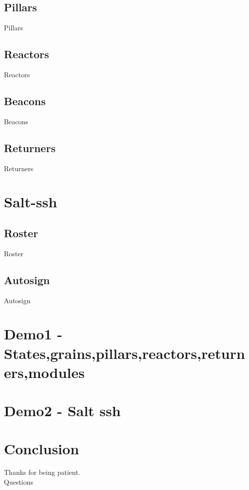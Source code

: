 \documentclass[pdf]{beamer}
\begin{document}
	\subsection{Pillars}
	\begin{frame}{Pillars}
	\end{frame}


	\subsection{Reactors}
	\begin{frame}{Reactors}
	\end{frame}

	
	\subsection{Beacons}
	\begin{frame}{Beacons}
	\end{frame}


	\subsection{Returners}
	\begin{frame}{Returners}
	\end{frame}


	\section{Salt-ssh}
	\subsection{Roster}
	\begin{frame}{Roster}
	\end{frame}

	\subsection{Autosign}
	\begin{frame}{Autosign}
	\end{frame}

	\section{Demo1 - States,grains,pillars,reactors,returners,modules}
	\section{Demo2 - Salt ssh}
	
	\section{Conclusion}
	\begin{frame}
		Thanks for being patient.\\
		Questions
	\end{frame}
\end{document}
